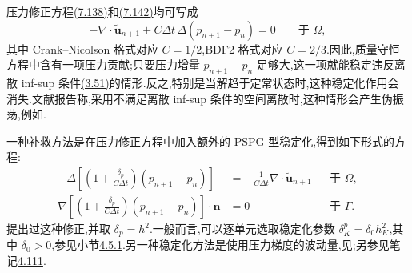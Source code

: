 \begin{note}[空间离散的稳定性]\label{note:incremental-pressure-correction-spatial-stability}
压力修正方程\hyperref[eq:incremental-pressure-poisson-cn]{(7.138)}和\hyperref[eq:incremental-pressure-poisson-bdf2]{(7.142)}均可写成
\[
 -\nabla\cdot\widetilde{\bm{u}}_{n+1}
   +C\Delta t\,\Delta(p_{n+1}-p_n)=0
   \qquad\text{于 }\Omega,
\]
其中 Crank--Nicolson 格式对应 $C=1/2$,BDF2 格式对应 $C=2/3$.因此,质量守恒方程中含有一项压力贡献;只要压力增量 $p_{n+1}-p_n$ 足够大,这一项就能稳定违反离散 inf-sup 条件\hyperref[eq:discrete-infsup-condition]{(3.51)}的情形.反之,特别是当解趋于定常状态时,这种稳定化作用会消失.文献报告称,采用不满足离散 inf-sup 条件的空间离散时,这种情形会产生伪振荡,例如\textcite{GuermondQuartapelle1998,deFrutos2016c}.

一种补救方法是在压力修正方程中加入额外的 PSPG 型稳定化,得到如下形式的方程:
\[
\begin{aligned}
 -\Delta\left[
   \left(1+\frac{\delta_p}{C\Delta t}\right)(p_{n+1}-p_n)
   \right]
 &=-\frac{1}{C\Delta t}
    \nabla\cdot\widetilde{\bm{u}}_{n+1}
      &&\text{于 }\Omega,\\
 \nabla\left[
   \left(1+\frac{\delta_p}{C\Delta t}\right)(p_{n+1}-p_n)
   \right]\cdot\bm{n}&=0
      &&\text{于 }\Gamma.
\end{aligned}
\]
\textcite[Chap.~7.4]{Prohl1997}提出过这种修正,并取 $\delta_p=h^2$.一般而言,可以逐单元选取稳定化参数
$\delta_{K}^p=\delta_0h_K^2$,其中 $\delta_0>0$,参见小节\hyperref[sec:stokes-pspg]{4.5.1}.另一种稳定化方法是使用压力梯度的波动量,见\textcite{Codina2001a};另参见笔记\hyperref[note:stokes-pressure-gradient-fluctuations]{4.111}.
\end{note}

